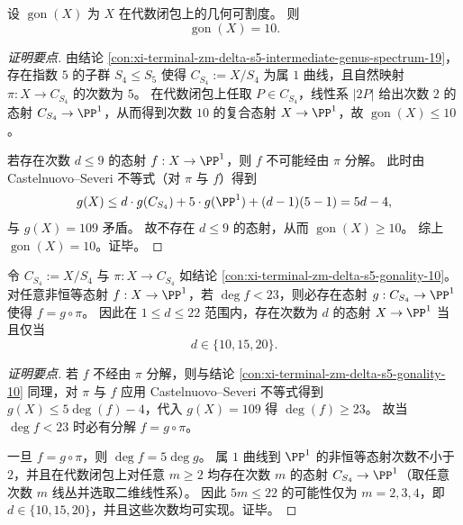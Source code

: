 \begin{conclusion}[可割度的精确值]\label{con:xi-terminal-zm-delta-s5-gonality-10}
设 \(\operatorname{gon}(X)\) 为 \(X\) 在代数闭包上的几何可割度。
则
\[
\operatorname{gon}(X)=10.
\]
\end{conclusion}
\begin{proof}[证明要点]
由结论 \ref{con:xi-terminal-zm-delta-s5-intermediate-genus-spectrum-19}，存在指数 \(5\) 的子群 \(S_4\le S_5\) 使得 \(C_{S_4}:=X/S_4\) 为属 \(1\) 曲线，且自然映射 \(\pi:X\to C_{S_4}\) 的次数为 \(5\)。
在代数闭包上任取 \(P\in C_{S_4}\)，线性系 \(|2P|\) 给出次数 \(2\) 的态射 \(C_{S_4}\to\PP^1\)，从而得到次数 \(10\) 的复合态射 \(X\to\PP^1\)，故 \(\operatorname{gon}(X)\le 10\)。
\par
若存在次数 \(d\le 9\) 的态射 \(f:X\to\PP^1\)，则 \(f\) 不可能经由 \(\pi\) 分解。
此时由 Castelnuovo--Severi 不等式（对 \(\pi\) 与 \(f\)）得到
\[
g(X)\le d\cdot g(C_{S_4})+5\cdot g(\PP^1)+(d-1)(5-1)=5d-4,
\]
与 \(g(X)=109\) 矛盾。
故不存在 \(d\le 9\) 的态射，从而 \(\operatorname{gon}(X)\ge 10\)。
综上 \(\operatorname{gon}(X)=10\)。证毕。
\end{proof}

\begin{conclusion}\label{con:xi-terminal-zm-delta-s5-degree-threshold-23}
令 \(C_{S_4}:=X/S_4\) 与 \(\pi:X\to C_{S_4}\) 如结论 \ref{con:xi-terminal-zm-delta-s5-gonality-10}。
对任意非恒等态射 \(f:X\to\PP^1\)，若 \(\deg f<23\)，则必存在态射 \(g:C_{S_4}\to\PP^1\) 使得 \(f=g\circ\pi\)。
因此在 \(1\le d\le 22\) 范围内，存在次数为 \(d\) 的态射 \(X\to\PP^1\) 当且仅当
\[
d\in\{10,15,20\}.
\]
\end{conclusion}
\begin{proof}[证明要点]
若 \(f\) 不经由 \(\pi\) 分解，则与结论 \ref{con:xi-terminal-zm-delta-s5-gonality-10} 同理，对 \(\pi\) 与 \(f\) 应用 Castelnuovo--Severi 不等式得到
\(
g(X)\le 5\deg(f)-4
\)，代入 \(g(X)=109\) 得 \(\deg(f)\ge 23\)。
故当 \(\deg f<23\) 时必有分解 \(f=g\circ\pi\)。
\par
一旦 \(f=g\circ\pi\)，则 \(\deg f=5\deg g\)。
属 \(1\) 曲线到 \(\PP^1\) 的非恒等态射次数不小于 \(2\)，并且在代数闭包上对任意 \(m\ge 2\) 均存在次数 \(m\) 的态射 \(C_{S_4}\to\PP^1\)（取任意次数 \(m\) 线丛并选取二维线性系）。
因此 \(5m\le 22\) 的可能性仅为 \(m=2,3,4\)，即 \(d\in\{10,15,20\}\)，并且这些次数均可实现。证毕。
\end{proof}

